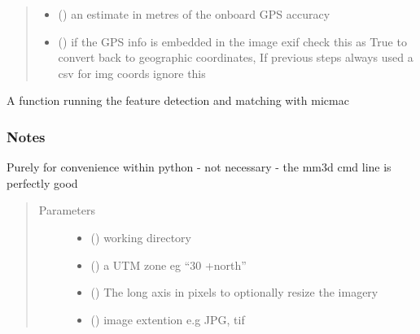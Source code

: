 \documentclass[letterpaper,10pt,english]{sphinxmanual}
\begin{document}
\begin{fulllineitems}
\begin{quote}
\begin{description}
\begin{itemize}
\item {} 
 () \textendash{} an estimate in metres of the onboard GPS accuracy

\item {} 
 () \textendash{} if the GPS info is embedded in the image exif check this as True to
convert back to geographic coordinates,
If previous steps always used a csv for img coords ignore this

\end{itemize}

\end{description}\end{quote}

\end{fulllineitems}


\begin{fulllineitems}
\label{\detokenize{pycmac:orientation.feature_match}}
A function running the feature detection and matching with micmac
\subsubsection*{Notes}

Purely for convenience within python - not  necessary - the mm3d cmd line
is perfectly good
\begin{quote}\begin{description}
\item[{Parameters}] \leavevmode\begin{itemize}
\item {} 
 () \textendash{} working directory

\item {} 
 () \textendash{} a UTM zone eg “30 +north”

\item {} 
 () \textendash{} The long axis in pixels to optionally resize the imagery

\item {} 
 () \textendash{} image extention e.g JPG, tif

\end{itemize}

\end{description}\end{quote}

\end{fulllineitems}
\end{document}
